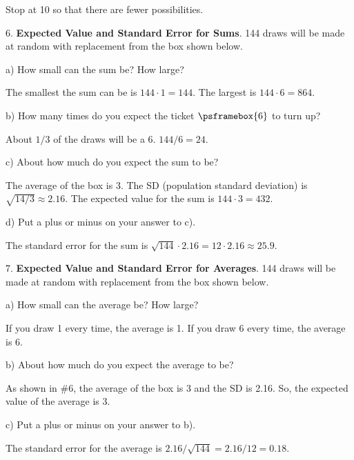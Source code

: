 \documentclass[10pt]{article}
\begin{document}
{\color{blue} Stop at 10 so that there are fewer possibilities.}
\smallskip
\bigskip

6. \textbf{Expected Value and Standard Error for Sums}.  
144 draws will be made at random with replacement
from the box shown below.\vspace{-20pt}
\begin{center}
\end{center}
\hspace{10pt} a)  How small can the sum be?  How large?

{\color{blue} The smallest the sum can be is $144\cdot 1 = 144$.  The largest
is $144\cdot 6 = 864$.}
\smallskip

\hspace{10pt} b) How many times do you expect the ticket $\psframebox{6}$ to turn up?

{\color{blue} About $1/3$ of the draws will be a 6.  $144/6=24$.}
\smallskip

\hspace{10pt} c) About how much do you expect the sum to be?

{\color{blue} The average of the box is 3.  The SD (population standard deviation) is $\sqrt{14/3}\approx 2.16$.
The expected value for the sum is $144\cdot 3 = 432$.}
\smallskip

\hspace{10pt} d)  Put a plus or minus on your answer to c).

{\color{blue} The standard error for the sum is $\sqrt{144}\cdot 2.16 = 12\cdot 2.16 \approx 25.9$.}
\smallskip
\bigskip

7. \textbf{Expected Value and Standard Error for Averages}. 
144 draws will be made at random with replacement
from the box shown below.\vspace{-20pt}
\begin{center}
\end{center}
\hspace{10pt} a)  How small can the average be?  How large?

{\color{blue} If you draw 1 every time, the average is 1.  If you draw 6 every time, the average is 6.}
\smallskip

\hspace{10pt} b) About how much do you expect the average to be?

{\color{blue} As shown in \#6, the average of the box is 3 and the SD is 2.16.  So, the expected value
of the average is 3.}
\smallskip

\hspace{10pt} c)  Put a plus or minus on your answer to b).

{\color{blue} The standard error for the average is $2.16/\sqrt{144}=2.16/12 = 0.18$.}
\vspace{.6in}
\end{document}
